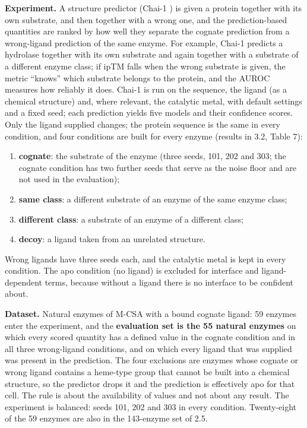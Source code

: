 \documentclass[
  10pt,
]{article}
\providecommand{\tightlist}{%
  \setlength{\itemsep}{0pt}\setlength{\parskip}{0pt}}
\DeclareRobustCommand{\_}{\textunderscore\hspace{0pt}}
\begin{document}
\textbf{Experiment.}
A structure
predictor (Chai-1
\cite{chai2024}) is
given a protein
together with its
own substrate, and
then together with a
wrong one, and the
prediction-based
quantities are
ranked by how well
they separate the
cognate prediction
from a wrong-ligand
prediction of the
same enzyme. For
example, Chai-1
predicts a hydrolase
together with its
own substrate and
again together with
a substrate of a
different enzyme
class; if ipTM falls
when the wrong
substrate is given,
the metric ``knows''
which substrate
belongs to the
protein, and the
AUROC measures how
reliably it does.
Chai-1 is run on the
sequence, the ligand
(as a chemical
structure) and,
where relevant, the
catalytic metal,
with default
settings and a fixed
seed; each
prediction yields
five models and
their confidence
scores. Only the
ligand supplied
changes; the protein
sequence is the same
in every condition,
and four conditions
are built for every
enzyme (results in
3.2, Table 7):

\begin{enumerate}
\def\labelenumi{\arabic{enumi}.}
\tightlist
\item
  \textbf{cognate}:
  the substrate of
  the enzyme (three
  seeds, 101, 202
  and 303; the
  cognate condition
  has two further
  seeds that serve
  as the noise floor
  and are not used
  in the
  evaluation);
\item
  \textbf{same
  class}: a
  different
  substrate of an
  enzyme of the same
  enzyme class;
\item
  \textbf{different
  class}: a
  substrate of an
  enzyme of a
  different class;
\item
  \textbf{decoy}: a
  ligand taken from
  an unrelated
  structure.
\end{enumerate}

Wrong ligands have
three seeds each,
and the catalytic
metal is kept in
every condition. The
apo condition (no
ligand) is excluded
for interface and
ligand-dependent
terms, because
without a ligand
there is no
interface to be
confident about.

\textbf{Dataset.}
Natural enzymes of
M-CSA
\cite{ribeiro2018}
with a bound cognate
ligand: 59 enzymes
enter the
experiment, and the
\textbf{evaluation
set is the 55
natural enzymes} on
which every scored
quantity has a
defined value in the
cognate condition
and in all three
wrong-ligand
conditions, and on
which every ligand
that was supplied
was present in the
prediction. The four
exclusions are
enzymes whose
cognate or wrong
ligand contains a
heme-type group that
cannot be built into
a chemical
structure, so the
predictor drops it
and the prediction
is effectively apo
for that cell. The
rule is about the
availability of
values and not about
any result. The
experiment is
balanced: seeds 101,
202 and 303 in every
condition.
Twenty-eight of the
59 enzymes are also
in the 143-enzyme
set of 2.5.
\end{document}
